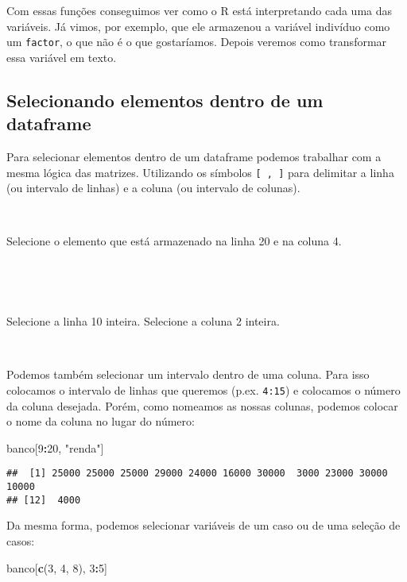 \documentclass[]{book}
\newenvironment{Shaded}{\begin{snugshade}}{\end{snugshade}}
\newcommand{\DecValTok}[1]{\textcolor[rgb]{0.00,0.00,0.81}{#1}}
\newcommand{\KeywordTok}[1]{\textcolor[rgb]{0.13,0.29,0.53}{\textbf{#1}}}
\newcommand{\NormalTok}[1]{#1}
\newcommand{\OperatorTok}[1]{\textcolor[rgb]{0.81,0.36,0.00}{\textbf{#1}}}
\newcommand{\StringTok}[1]{\textcolor[rgb]{0.31,0.60,0.02}{#1}}
\theoremstyle{definition}
\theoremstyle{definition}
\theoremstyle{definition}
\theoremstyle{remark}
\let\BeginKnitrBlock\begin \let\EndKnitrBlock\end
\begin{document}
Com essas funções conseguimos ver como o R está interpretando cada uma das variáveis. Já vimos, por exemplo, que ele armazenou a variável indivíduo como um \texttt{factor}, o que não é o que gostaríamos. Depois veremos como transformar essa variável em texto.

\hypertarget{selecionando-elementos-dentro-de-um-dataframe}{%
\subsection{Selecionando elementos dentro de um dataframe}\label{selecionando-elementos-dentro-de-um-dataframe}}

Para selecionar elementos dentro de um dataframe podemos trabalhar com a mesma lógica das matrizes. Utilizando os símbolos \texttt{{[}\ ,\ {]}} para delimitar a linha (ou intervalo de linhas) e a coluna (ou intervalo de colunas).

~
\BeginKnitrBlock{exercise}
\protect\hypertarget{exr:unnamed-chunk-74}{}{\label{exr:unnamed-chunk-74} }Selecione o elemento que está armazenado na linha 20 e na coluna 4.
\EndKnitrBlock{exercise}

~

~
\BeginKnitrBlock{exercise}
\protect\hypertarget{exr:unnamed-chunk-75}{}{\label{exr:unnamed-chunk-75} }Selecione a linha 10 inteira. Selecione a coluna 2 inteira.
\EndKnitrBlock{exercise}

~

Podemos também selecionar um intervalo dentro de uma coluna. Para isso colocamos o intervalo de linhas que queremos (p.ex. \texttt{4:15}) e colocamos o número da coluna desejada. Porém, como nomeamos as nossas colunas, podemos colocar o nome da coluna no lugar do número:

\begin{Shaded}
\begin{Highlighting}[]
\NormalTok{banco[}\DecValTok{9}\OperatorTok{:}\DecValTok{20}\NormalTok{, }\StringTok{"renda"}\NormalTok{]}
\end{Highlighting}
\end{Shaded}

\begin{verbatim}
##  [1] 25000 25000 25000 29000 24000 16000 30000  3000 23000 30000 10000
## [12]  4000
\end{verbatim}

Da mesma forma, podemos selecionar variáveis de um caso ou de uma seleção de casos:

\begin{Shaded}
\begin{Highlighting}[]
\NormalTok{banco[}\KeywordTok{c}\NormalTok{(}\DecValTok{3}\NormalTok{, }\DecValTok{4}\NormalTok{, }\DecValTok{8}\NormalTok{), }\DecValTok{3}\OperatorTok{:}\DecValTok{5}\NormalTok{]}
\end{Highlighting}
\end{Shaded}
\end{document}
